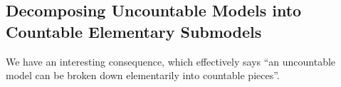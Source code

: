 \subsection{Decomposing Uncountable Models into Countable Elementary Submodels}

We have an interesting consequence, which effectively says ``an uncountable model can be broken down elementarily into countable pieces''.


